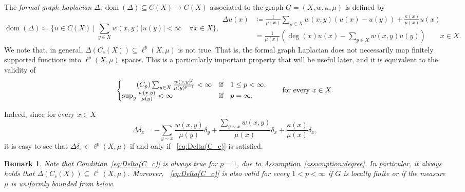 \documentclass[journal]{article}
\theoremstyle{nonitalic}
\theoremstyle{nonitalic}
\newtheorem{remark}[theorem]{Remark}
\theoremstyle{plain} %
\numberwithin{equation}{section}
\newcommand{\dom}{\operatorname{dom}}
\begin{document}
The \emph{formal graph Laplacian}  $\Delta \colon \dom\left(\Delta\right) \subseteq C(X) \to C(X)$ associated to the graph $G=(X,w,\kappa,\mu)$ is defined by
		\begin{subequations}
			\begin{equation}
			\dom\left(\Delta\right)\coloneqq\{ u \in C(X) \mid \sum_{y\in X}w(x,y)|u(y)| < \infty \quad \forall x \in X  \},\label{formal_laplacian1}
			\end{equation}
			\begin{align}
			\Delta u(x)&\coloneqq \frac{1}{\mu(x)}\sum_{y\in X} w(x,y)\left(u(x) - u(y)\right) + \frac{\kappa(x)}{\mu(x)}u(x)\label{formal_laplacian2}\\
            &= \frac{1}{\mu(x)}\left(\operatorname{deg}(x)u(x) - \sum_{y\in X}w(x,y)u(y)\right)\qquad x\in X. \nonumber
			\end{align}
		\end{subequations}
We note that, in general,  $\Delta(C_c(X)) \subseteq \ell^p(X,\mu)$ is not true.  	That is, the formal graph Laplacian does not necessarily map finitely supported functions into $\ell^p(X,\mu)$ spaces. This is a particularly important property that will be useful later, and it is equivalent to the validity of 
\begin{equation}
\begin{cases}\tag{\textnormal{$C_p$}}\label{eq:Delta(C_c)}
 \sum_{y\in X} \frac{w(x,y)^p}{\mu(y)^{p-1}}  < \infty & \mbox{if} \quad 1\leq p < \infty,\\
 \sup_y \frac{w(x,y)}{\mu(y)}  < \infty & \mbox{if} \quad p= \infty,
\end{cases}\qquad \mbox{for every } x\in X.
\end{equation}


Indeed, since for every $x\in X$ 
$$
\Delta \delta_x=-\sum_{y\sim x}\frac{w(x,y)}{\mu(y)}\delta_y + \frac{ \sum_{y\sim x}w(x,y)}{\mu(x)}\delta_x  +\frac{\kappa(x)}{\mu(x)}\delta_x,
$$
it is easy to see that $\Delta \delta_x\in \ell^p(X,\mu)$ if and only if ~\eqref{eq:Delta(C_c)} is satisfied.




\begin{remark}\label{rem:Delta(C_c)_in_ell1}
Note that Condition~\eqref{eq:Delta(C_c)} is always true for $p=1$, due to Assumption~\ref{assumption:degree}. In particular, it always holds that $\Delta (C_c(X)) \subseteq \ell^1(X,\mu)$. Moreover, ~\eqref{eq:Delta(C_c)} is also valid  for every $1<p<\infty$  if $G$ is locally finite or if the measure $\mu$ is uniformly bounded from below. 
\end{remark}
\end{document}
